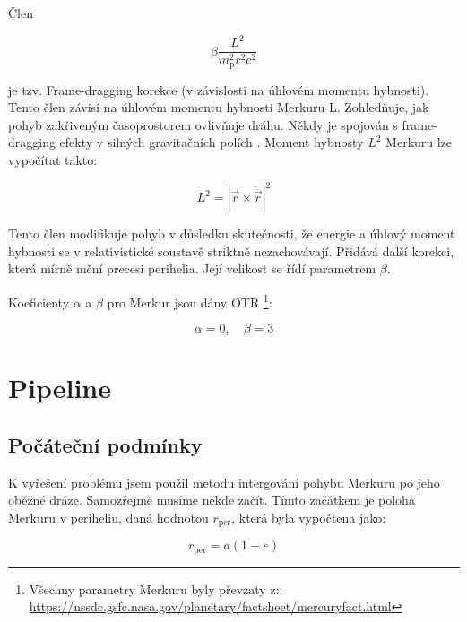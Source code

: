 \documentclass[a4paper,11pt,twocolumn]{article}
\begin{document}
        Člen

        \begin{equation*}
            \beta \frac{L^2}{m_{\text{p}}^2 r^2 c^2}
        \end{equation*}

        je tzv. Frame-dragging korekce (v závislosti na úhlovém momentu hybnosti). Tento člen závisí na úhlovém momentu hybnosti Merkuru L. Zohledňuje, jak pohyb zakřiveným časoprostorem ovlivňuje dráhu. Někdy je spojován s frame-dragging efekty v silných gravitačních polích \cite{pfister2007}. Moment hybnosty $L^2$ Merkuru lze vypočítat takto:
        
        \begin{equation}
            L^2 = |\vec{r} \times \dot{\vec{r}}|^2 
            \label{eq:angular_momentum}
        \end{equation}

        Tento člen modifikuje pohyb v důsledku skutečnosti, že energie a úhlový moment hybnosti se v relativistické soustavě striktně nezachovávají. Přidává další korekci, která mírně mění precesi perihelia. Její velikost se řídí parametrem $\beta$.

        Koeficienty $\alpha$ a $\beta$ pro Merkur jsou dány OTR \footnote{Všechny parametry Merkuru byly převzaty z:: \url{https://nssdc.gsfc.nasa.gov/planetary/factsheet/mercuryfact.html}}: 
        
        \begin{equation}
            \alpha = 0, \quad \beta = 3
            \label{eq:alpha_beta}
        \end{equation}

    \section{Pipeline}
        \subsection{Počáteční podmínky}
            K vyřešení problému jsem použil metodu intergování pohybu Merkuru po jeho oběžné dráze. Samozřejmě musíme někde začít. Tímto začátkem je poloha Merkuru v periheliu, daná hodnotou $r_{\text{per}}$, která byla vypočtena jako:

            \begin{equation}
                r_{\text{per}} = a(1 - e)
                \label{eq:r_per}
            \end{equation}
\end{document}
